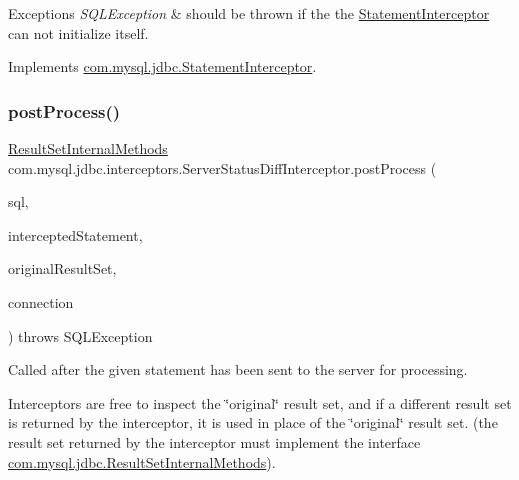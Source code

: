\begin{DoxyExceptions}{Exceptions}
{\em S\+Q\+L\+Exception} & should be thrown if the the \mbox{\hyperlink{interfacecom_1_1mysql_1_1jdbc_1_1_statement_interceptor}{Statement\+Interceptor}} can not initialize itself. \\
\hline
\end{DoxyExceptions}


Implements \mbox{\hyperlink{interfacecom_1_1mysql_1_1jdbc_1_1_statement_interceptor_a985c3d5d0c9b9694cfb73ba92273409e}{com.\+mysql.\+jdbc.\+Statement\+Interceptor}}.

\mbox{\label{classcom_1_1mysql_1_1jdbc_1_1interceptors_1_1_server_status_diff_interceptor_abe61d99e64bc15f2c21ffbfcfb90b1d7}} 
\subsubsection{\texorpdfstring{post\+Process()}{postProcess()}}
{\footnotesize\ttfamily \mbox{\hyperlink{interfacecom_1_1mysql_1_1jdbc_1_1_result_set_internal_methods}{Result\+Set\+Internal\+Methods}} com.\+mysql.\+jdbc.\+interceptors.\+Server\+Status\+Diff\+Interceptor.\+post\+Process (\begin{DoxyParamCaption}\item[{String}]{sql,  }\item[{\mbox{\hyperlink{interfacecom_1_1mysql_1_1jdbc_1_1_statement}{Statement}}}]{intercepted\+Statement,  }\item[{\mbox{\hyperlink{interfacecom_1_1mysql_1_1jdbc_1_1_result_set_internal_methods}{Result\+Set\+Internal\+Methods}}}]{original\+Result\+Set,  }\item[{\mbox{\hyperlink{interfacecom_1_1mysql_1_1jdbc_1_1_connection}{Connection}}}]{connection }\end{DoxyParamCaption}) throws S\+Q\+L\+Exception}

Called after the given statement has been sent to the server for processing.

Interceptors are free to inspect the \char`\"{}original\char`\"{} result set, and if a different result set is returned by the interceptor, it is used in place of the \char`\"{}original\char`\"{} result set. (the result set returned by the interceptor must implement the interface \mbox{\hyperlink{interfacecom_1_1mysql_1_1jdbc_1_1_result_set_internal_methods}{com.\+mysql.\+jdbc.\+Result\+Set\+Internal\+Methods}}).


